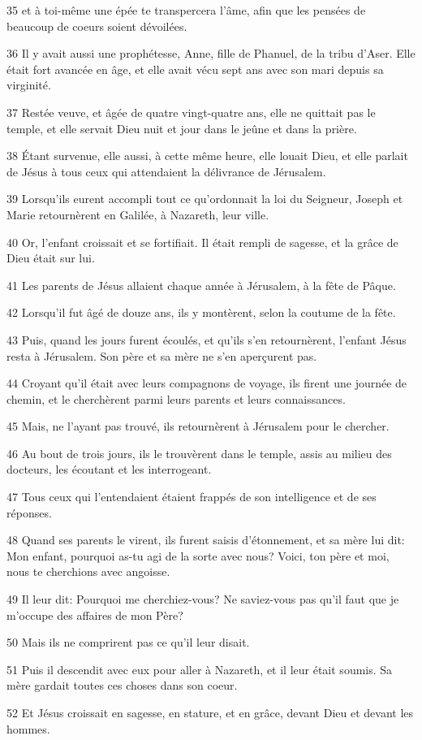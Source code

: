 \par 35 et à toi-même une épée te transpercera l'âme, afin que les pensées de beaucoup de coeurs soient dévoilées.
\par 36 Il y avait aussi une prophétesse, Anne, fille de Phanuel, de la tribu d'Aser. Elle était fort avancée en âge, et elle avait vécu sept ans avec son mari depuis sa virginité.
\par 37 Restée veuve, et âgée de quatre vingt-quatre ans, elle ne quittait pas le temple, et elle servait Dieu nuit et jour dans le jeûne et dans la prière.
\par 38 Étant survenue, elle aussi, à cette même heure, elle louait Dieu, et elle parlait de Jésus à tous ceux qui attendaient la délivrance de Jérusalem.
\par 39 Lorsqu'ils eurent accompli tout ce qu'ordonnait la loi du Seigneur, Joseph et Marie retournèrent en Galilée, à Nazareth, leur ville.
\par 40 Or, l'enfant croissait et se fortifiait. Il était rempli de sagesse, et la grâce de Dieu était sur lui.
\par 41 Les parents de Jésus allaient chaque année à Jérusalem, à la fête de Pâque.
\par 42 Lorsqu'il fut âgé de douze ans, ils y montèrent, selon la coutume de la fête.
\par 43 Puis, quand les jours furent écoulés, et qu'ils s'en retournèrent, l'enfant Jésus resta à Jérusalem. Son père et sa mère ne s'en aperçurent pas.
\par 44 Croyant qu'il était avec leurs compagnons de voyage, ils firent une journée de chemin, et le cherchèrent parmi leurs parents et leurs connaissances.
\par 45 Mais, ne l'ayant pas trouvé, ils retournèrent à Jérusalem pour le chercher.
\par 46 Au bout de trois jours, ils le trouvèrent dans le temple, assis au milieu des docteurs, les écoutant et les interrogeant.
\par 47 Tous ceux qui l'entendaient étaient frappés de son intelligence et de ses réponses.
\par 48 Quand ses parents le virent, ils furent saisis d'étonnement, et sa mère lui dit: Mon enfant, pourquoi as-tu agi de la sorte avec nous? Voici, ton père et moi, nous te cherchions avec angoisse.
\par 49 Il leur dit: Pourquoi me cherchiez-vous? Ne saviez-vous pas qu'il faut que je m'occupe des affaires de mon Père?
\par 50 Mais ils ne comprirent pas ce qu'il leur disait.
\par 51 Puis il descendit avec eux pour aller à Nazareth, et il leur était soumis. Sa mère gardait toutes ces choses dans son coeur.
\par 52 Et Jésus croissait en sagesse, en stature, et en grâce, devant Dieu et devant les hommes.

